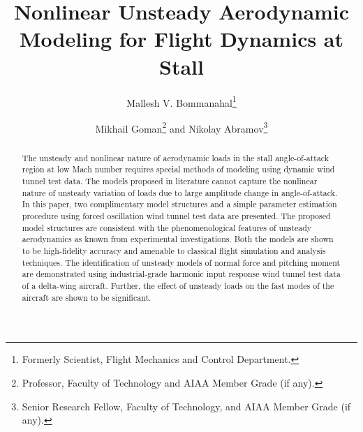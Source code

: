 \documentclass{AIAA}
\begin{document}
\title{Nonlinear Unsteady Aerodynamic Modeling for Flight Dynamics at Stall}

\author{Mallesh V. Bommanahal\footnote{Formerly Scientist, Flight Mechanics and Control Department.}}

\author{Mikhail Goman\footnote{Professor, Faculty of Technology and AIAA Member Grade (if any).} and Nikolay Abramov\footnote{Senior Research Fellow, Faculty of Technology, and AIAA Member Grade (if any).}}


\begin{abstract} %
The unsteady and nonlinear nature of aerodynamic loads in the stall angle-of-attack region at low Mach number requires special methods of modeling using dynamic wind tunnel test data. The models proposed in literature cannot capture the nonlinear nature of unsteady variation of loads due to large amplitude change in angle-of-attack. In this paper, two complimentary model structures and a simple parameter estimation procedure using forced oscillation wind tunnel test data are presented. The proposed model structures are consistent with the phenomenological features of unsteady aerodynamics as known from experimental investigations. Both the models are shown to be high-fidelity accuracy and amenable to classical flight simulation and analysis techniques. The identification of unsteady models of normal force and pitching moment are demonstrated using industrial-grade harmonic input response wind tunnel test data of a delta-wing aircraft. Further, the effect of unsteady loads on the fast modes of the aircraft are shown to be significant.
\end{abstract}

\maketitle
\end{document}
